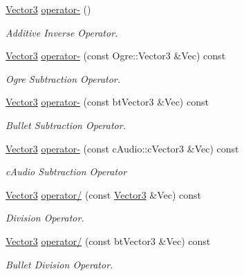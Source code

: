 \begin{DoxyCompactItemize}
\hyperlink{classMezzanine_1_1Vector3}{Vector3} \hyperlink{classMezzanine_1_1Vector3_aeed0db21c3c82f0a8bb83e8007afca6d}{operator-\/} ()
\begin{DoxyCompactList}\small\item\em Additive Inverse Operator. \item\end{DoxyCompactList}\item 
\hyperlink{classMezzanine_1_1Vector3}{Vector3} \hyperlink{classMezzanine_1_1Vector3_ad59d3f710c34350111076c7f0392a084}{operator-\/} (const Ogre::Vector3 \&Vec) const 
\begin{DoxyCompactList}\small\item\em Ogre Subtraction Operator. \item\end{DoxyCompactList}\item 
\hyperlink{classMezzanine_1_1Vector3}{Vector3} \hyperlink{classMezzanine_1_1Vector3_a9306b274042f67be5023fad08e95ce44}{operator-\/} (const btVector3 \&Vec) const 
\begin{DoxyCompactList}\small\item\em Bullet Subtraction Operator. \item\end{DoxyCompactList}\item 
\hyperlink{classMezzanine_1_1Vector3}{Vector3} \hyperlink{classMezzanine_1_1Vector3_a538da2943b8c8a3dd7a6e60212fa244c}{operator-\/} (const cAudio::cVector3 \&Vec) const 
\begin{DoxyCompactList}\small\item\em cAudio Subtraction Operator \item\end{DoxyCompactList}\item 
\hyperlink{classMezzanine_1_1Vector3}{Vector3} \hyperlink{classMezzanine_1_1Vector3_a18fdcebbb90b2e489d9f35d45ce6d808}{operator/} (const \hyperlink{classMezzanine_1_1Vector3}{Vector3} \&Vec) const 
\begin{DoxyCompactList}\small\item\em Division Operator. \item\end{DoxyCompactList}\item 
\hyperlink{classMezzanine_1_1Vector3}{Vector3} \hyperlink{classMezzanine_1_1Vector3_a5984dc60bffd73e2a067fdb86f847319}{operator/} (const btVector3 \&Vec) const 
\begin{DoxyCompactList}\small\item\em Bullet Division Operator. \item\end{DoxyCompactList}\item 

\end{DoxyCompactItemize}

